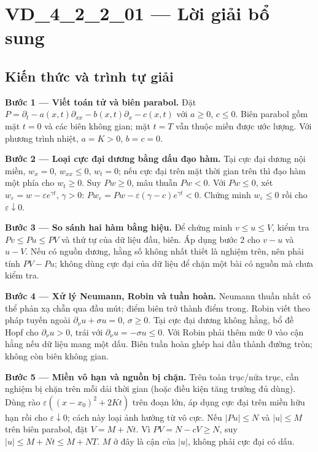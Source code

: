 \documentclass[10pt,a4paper]{article}
\begin{document}
\section*{VD\_4\_2\_2\_01 — Lời giải bổ sung}
\subsection*{Kiến thức và trình tự giải}
\textbf{Bước 1 — Viết toán tử và biên parabol.} Đặt $P=\partial_t-a(x,t)\partial_{xx}-b(x,t)\partial_x-c(x,t)$ với $a\ge0$, $c\le0$. Biên parabol gồm mặt $t=0$ và các biên không gian; mặt $t=T$ vẫn thuộc miền được ước lượng. Với phương trình nhiệt, $a=K>0$, $b=c=0$.

\textbf{Bước 2 — Loại cực đại dương bằng dấu đạo hàm.} Tại cực đại dương nội miền, $w_x=0$, $w_{xx}\le0$, $w_t=0$; nếu cực đại trên mặt thời gian trên thì đạo hàm một phía cho $w_t\ge0$. Suy $Pw\ge0$, mâu thuẫn $Pw<0$. Với $Pw\le0$, xét $w_\varepsilon=w-\varepsilon e^{\gamma t}$, $\gamma>0$: $Pw_\varepsilon=Pw-\varepsilon(\gamma-c)e^{\gamma t}<0$. Chứng minh $w_\varepsilon\le0$ rồi cho $\varepsilon\downarrow0$.

\textbf{Bước 3 — So sánh hai hàm bằng hiệu.} Để chứng minh $v\le u\le V$, kiểm tra $Pv\le Pu\le PV$ và thứ tự của dữ liệu đầu, biên. Áp dụng bước 2 cho $v-u$ và $u-V$. Nếu có nguồn dương, hằng số không nhất thiết là nghiệm trên, nên phải tính $PV-Pu$; không dùng cực đại của dữ liệu để chặn một bài có nguồn mà chưa kiểm tra.

\textbf{Bước 4 — Xử lý Neumann, Robin và tuần hoàn.} Neumann thuần nhất có thể phản xạ chẵn qua đầu mút; điểm biên trở thành điểm trong. Robin viết theo pháp tuyến ngoài $\partial_\nu u+\sigma u=0$, $\sigma\ge0$. Tại cực đại dương không hằng, bổ đề Hopf cho $\partial_\nu u>0$, trái với $\partial_\nu u=-\sigma u\le0$. Với Robin phải thêm mức $0$ vào cận hằng nếu dữ liệu mang một dấu. Biên tuần hoàn ghép hai đầu thành đường tròn; không còn biên không gian.

\textbf{Bước 5 — Miền vô hạn và nguồn bị chặn.} Trên toàn trục/nửa trục, cần nghiệm bị chặn trên mỗi dải thời gian (hoặc điều kiện tăng trưởng đủ dùng). Dùng rào $\varepsilon((x-x_0)^2+2Kt)$ trên đoạn lớn, áp dụng cực đại trên miền hữu hạn rồi cho $\varepsilon\downarrow0$; cách này loại ảnh hưởng từ vô cực. Nếu $|Pu|\le N$ và $|u|\le M$ trên biên parabol, đặt $V=M+Nt$. Vì $PV=N-cV\ge N$, suy $|u|\le M+Nt\le M+NT$. $M$ ở đây là cận của $|u|$, không phải cực đại có dấu.
\end{document}
